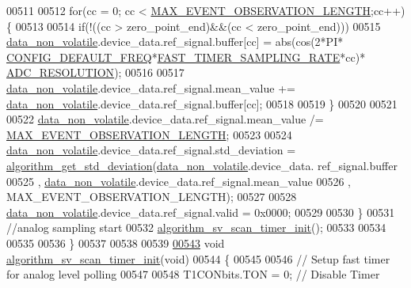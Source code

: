 \begin{DoxyCode}
{{{{{00511 
00512         \textcolor{keywordflow}{for}(cc = 0; cc < \hyperlink{a00022_aa060aeb1ecb530b3c6f6d91060999b70}{MAX\_EVENT\_OBSERVATION\_LENGTH};cc++)\{
00513 
00514         \textcolor{keywordflow}{if}(!((cc > zero\_point\_end)&&(cc < zero\_point\_end)))
00515         \hyperlink{a00060_a76ac5f917f5308dcd83de0d7c94559fb}{data\_non\_volatile}.device\_data.ref\_signal.buffer[cc]  = abs(cos(2*PI*
      \hyperlink{a00021_a985a153b3edd3d7d638137ae0b9e5e67}{CONFIG\_DEFAULT\_FREQ}*\hyperlink{a00021_a3a4dcb8af26a561d90607a41a3745806}{FAST\_TIMER\_SAMPLING\_RATE}*cc)*
      \hyperlink{a00058_a00978ca9e8220475258dcbbbb7d29129}{ADC\_RESOLUTION});
00516 
00517         \hyperlink{a00060_a76ac5f917f5308dcd83de0d7c94559fb}{data\_non\_volatile}.device\_data.ref\_signal.mean\_value +=
      \hyperlink{a00060_a76ac5f917f5308dcd83de0d7c94559fb}{data\_non\_volatile}.device\_data.ref\_signal.buffer[cc];
00518 
00519         \}
00520 
00521 
00522           \hyperlink{a00060_a76ac5f917f5308dcd83de0d7c94559fb}{data\_non\_volatile}.device\_data.ref\_signal.mean\_value /=
      \hyperlink{a00022_aa060aeb1ecb530b3c6f6d91060999b70}{MAX\_EVENT\_OBSERVATION\_LENGTH};
00523 
00524           \hyperlink{a00060_a76ac5f917f5308dcd83de0d7c94559fb}{data\_non\_volatile}.device\_data.ref\_signal.std\_deviation = 
      \hyperlink{a00038_a97eb6437dda088f144d791e49cd3dc2a}{algorithm\_get\_std\_deviation}(\hyperlink{a00060_a76ac5f917f5308dcd83de0d7c94559fb}{data\_non\_volatile}.device\_data.
      ref\_signal.buffer
00525                                                                                                ,
      \hyperlink{a00060_a76ac5f917f5308dcd83de0d7c94559fb}{data\_non\_volatile}.device\_data.ref\_signal.mean\_value
00526                                                                                                ,
      MAX\_EVENT\_OBSERVATION\_LENGTH);
00527 
00528           \hyperlink{a00060_a76ac5f917f5308dcd83de0d7c94559fb}{data\_non\_volatile}.device\_data.ref\_signal.valid = 0x0000;
00529 
00530     \}
00531     \textcolor{comment}{//analog sampling start}
00532     \hyperlink{a00038_ab898d2d804c49cb0978d26f6af64e0e4}{algorithm\_sv\_scan\_timer\_init}();
00533     
00534 
00535 
00536 \}
00537 
00538 
00539 
\hypertarget{a00038_source_l00543}{}\hyperlink{a00038_ab898d2d804c49cb0978d26f6af64e0e4}{00543} \textcolor{keywordtype}{void}   \hyperlink{a00038_ab898d2d804c49cb0978d26f6af64e0e4}{algorithm\_sv\_scan\_timer\_init}(\textcolor{keywordtype}{void})
00544 \{
00545 
00546     \textcolor{comment}{// Setup fast timer for analog level polling }
00547 
00548     T1CONbits.TON    = 0;                    \textcolor{comment}{// Disable Timer}
}}}}}
\end{DoxyCode}
